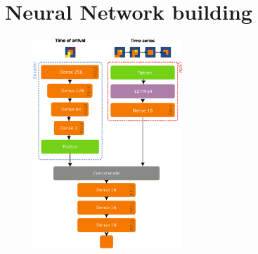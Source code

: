 \documentclass{beamer}
\begin{document}
\section{Neural Network building}

\begin{frame}

    \begin{figure}
        \centering
        \includegraphics[width=0.5\textwidth]{figures/model.pdf}
    \end{figure}

\end{frame}

\end{document}
